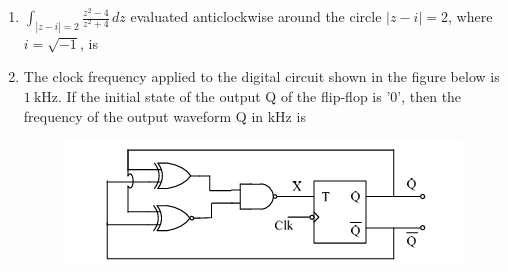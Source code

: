 \documentclass[journal,12pt,onecolumn]{IEEEtran}
\theoremstyle{remark}
\begin{document}
\begin{enumerate}
\begin{enumerate}
\end{enumerate}


\item $\displaystyle \int_{|z-i|=2} \frac{z^2-4}{z^2+4} \, dz$ evaluated anticlockwise around the circle $|z-i|=2$, where $i = \sqrt{-1}$, is

\begin{enumerate}
\end{enumerate}


\item The clock frequency applied to the digital circuit shown in the figure below is $1~\text{kHz}$. If the initial state of the output Q of the flip-flop is '0', then the frequency of the output waveform Q in kHz is
\begin{figure}[h]
    \centering
    \includegraphics[width=0.5\columnwidth]{figs/16.png}
    \label{fig:placeholder}
\end{figure}
\begin{enumerate}
\end{enumerate}


\end{enumerate}
\end{document}
